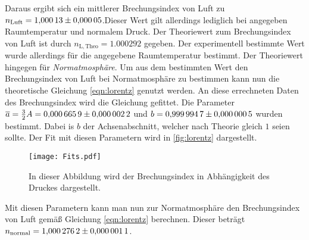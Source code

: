 Daraus ergibt sich ein mittlerer Brechungsindex von Luft zu $n_\mathrm{Luft} = \num{1.00013 \pm 0.00005}$.Dieser Wert gilt allerdings lediglich bei angegeben Raumtemperatur und normalem Druck. Der Theoriewert zum Brechungsindex von Luft ist durch $n_{\mathrm{L,Theo}} = 1.000292$ \cite{Ingenieurwissen}
gegeben. Der experimentell bestimmte Wert wurde allerdings für die angegebene Raumtemperatur bestimmt. Der Theoriewert hingegen für \textit{Normatmosphäre}. Um aus dem bestimmten 
Wert den Brechungsindex von Luft bei Normatmosphäre zu bestimmen kann nun die theoretische Gleichung \ref{eqn:lorentz} genutzt werden. An diese  errechneten 
Daten des Brechungsindex wird die Gleichung gefittet. Die Parameter $\overline{a} = \frac{3}{2}A = \num{0.0006659 \pm 0.0000022}$ und $b = \num{0.9999947 \pm 0.0000005}$ wurden bestimmt. Dabei is $b$
der Achsenabschnitt, welcher nach Theorie gleich $1$ seien sollte. Der Fit mit diesen Parametern wird in \autoref{fig:lorentz} dargestellt.

\begin{figure}
  \centering
  \texttt{[image: Fits.pdf]}
  \caption{In dieser Abbildung wird der Brechungsindex in Abhängigkeit des Druckes dargestellt.}
  \label{fig:lorentz}
\end{figure}

Mit diesen Parametern kann man nun zur Normatmosphäre den Brechungsindex von Luft gemäß Gleichung \ref{eqn:lorentz} berechnen. Dieser beträgt $n_\mathrm{normal} = \num{1.0002762 \pm 0.0000011}$.
